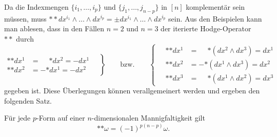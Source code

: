 Da die Indexmengen $\{i_1,\dots,i_p\}$ und
$\{j_1,\dots,j_{n-p}\}$ in $[n]$ komplementär sein müssen,
muss
\(
\ast\ast dx^{i_1}\wedge\dots\wedge dx^{i_p}
=
\pm dx^{i_1}\wedge\dots\wedge dx^{i_p}
\)
sein.
Aus den Beispielen kann man ablesen, dass in den Fällen $n=2$ und $n=3$
der iterierte Hodge-Operator  $\ast\ast$ durch
\[
\left.
\begin{aligned}
\ast{\ast dx^1} &= \phantom{-}{\ast dx^2} = -dx^1\\
\ast{\ast dx^2} &=          - {\ast dx^1} = -dx^2
\end{aligned}
\quad
\right\}
\qquad
\text{bzw.}
\qquad
\left\{
\quad
\begin{aligned}
\ast{\ast dx^1} &= \phantom{-}{\ast(dx^2\wedge dx^3)} = dx^1 \\
\ast{\ast dx^2} &=          - {\ast(dx^1\wedge dx^3)} = dx^2 \\
\ast{\ast dx^3} &= \phantom{-}{\ast(dx^1\wedge dx^2)} = dx^3 
\end{aligned}
\right.
\]
gegeben ist.
Diese Überlegungen können verallgemeinert werden und ergeben den
folgenden Satz.

\begin{satz}
Für jede $p$-Form auf einer $n$-dimensionalen Mannigfaltigkeit gilt
\[
\ast{\ast \omega}
=
(-1)^{p(n-p)}\omega.
\]
\end{satz}

